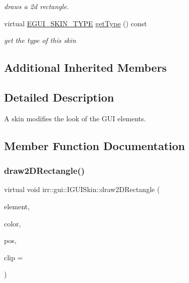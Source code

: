 \begin{DoxyCompactItemize}
\begin{DoxyCompactList}\small\item\em draws a 2d rectangle. \end{DoxyCompactList}\item 
\mbox{\label{classirr_1_1gui_1_1IGUISkin_ad42c8e52f5e60d27d065f6546446d9ff}} 
virtual \hyperlink{namespaceirr_1_1gui_a7b4619db540cbdf96e81023893b4eca5}{E\+G\+U\+I\+\_\+\+S\+K\+I\+N\+\_\+\+T\+Y\+PE} \hyperlink{classirr_1_1gui_1_1IGUISkin_ad42c8e52f5e60d27d065f6546446d9ff}{get\+Type} () const
\begin{DoxyCompactList}\small\item\em get the type of this skin \end{DoxyCompactList}\end{DoxyCompactItemize}
\subsection*{Additional Inherited Members}


\subsection{Detailed Description}
A skin modifies the look of the G\+UI elements. 

\subsection{Member Function Documentation}
\mbox{\label{classirr_1_1gui_1_1IGUISkin_a137082ed352db8dcb713449dfba0ff3e}} 
\subsubsection{\texorpdfstring{draw2\+D\+Rectangle()}{draw2DRectangle()}\hspace{0.1cm}{\footnotesize\ttfamily [1/2]}}
{\footnotesize\ttfamily virtual void irr\+::gui\+::\+I\+G\+U\+I\+Skin\+::draw2\+D\+Rectangle (\begin{DoxyParamCaption}\item[{\hyperlink{classirr_1_1gui_1_1IGUIElement}{I\+G\+U\+I\+Element} $\ast$}]{element,  }\item[{const \hyperlink{classirr_1_1video_1_1SColor}{video\+::\+S\+Color} \&}]{color,  }\item[{const \hyperlink{classirr_1_1core_1_1rect}{core\+::rect}$<$ \hyperlink{namespaceirr_ac66849b7a6ed16e30ebede579f9b47c6}{s32} $>$ \&}]{pos,  }\item[{const \hyperlink{classirr_1_1core_1_1rect}{core\+::rect}$<$ \hyperlink{namespaceirr_ac66849b7a6ed16e30ebede579f9b47c6}{s32} $>$ $\ast$}]{clip = {} }\end{DoxyParamCaption})\hspace{0.3cm}{\ttfamily [pure virtual]}}



